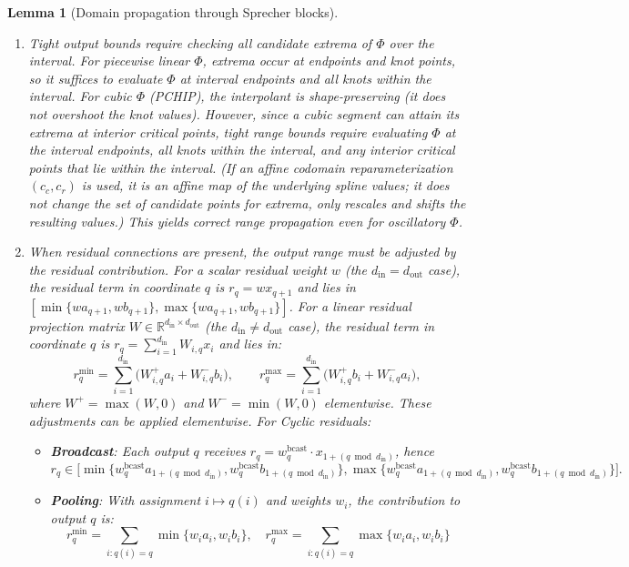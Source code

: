 \documentclass{article}
\theoremstyle{plain}
\newtheorem{lemma}{Lemma}
\theoremstyle{definition}
\theoremstyle{remark}
\begin{document}
\begin{lemma}[Domain propagation through Sprecher blocks]
\begin{enumerate}
\item Tight output bounds require checking all candidate extrema of $\Phi$ over the interval. For piecewise linear $\Phi$, extrema occur at endpoints and knot points, so it suffices to evaluate $\Phi$ at interval endpoints and all knots within the interval. For cubic $\Phi$ (PCHIP), the interpolant is shape-preserving (it does not overshoot the knot values). However, since a cubic segment can attain its extrema at interior critical points, tight range bounds require evaluating $\Phi$ at the interval endpoints, all knots within the interval, and any interior critical points that lie within the interval. (If an affine codomain reparameterization $(c_c,c_r)$ is used, it is an affine map of the underlying spline values; it does not change the set of candidate points for extrema, only rescales and shifts the resulting values.) This yields correct range propagation even for oscillatory $\Phi$.

\item When residual connections are present, the output range must be adjusted by the residual contribution. For a scalar residual weight $w$ (the $d_{\mathrm{in}}=d_{\mathrm{out}}$ case), the residual term in coordinate
$q$ is $r_q=w x_{q+1}$ and lies in $[\min\{w a_{q+1},w b_{q+1}\},\max\{w a_{q+1},w b_{q+1}\}]$. For a linear residual projection matrix $W\in\mathbb{R}^{d_{\mathrm{in}}\times d_{\mathrm{out}}}$ (the $d_{\mathrm{in}}\neq d_{\mathrm{out}}$ case), the residual term in coordinate $q$ is $r_q=\sum_{i=1}^{d_{\mathrm{in}}}W_{i,q}x_i$ and lies in:
$$r_q^{\min}=\sum_{i=1}^{d_{\mathrm{in}}}\bigl(W^{+}_{i,q}a_i+W^{-}_{i,q}b_i\bigr),\qquad
r_q^{\max}=\sum_{i=1}^{d_{\mathrm{in}}}\bigl(W^{+}_{i,q}b_i+W^{-}_{i,q}a_i\bigr),$$
where $W^{+}=\max(W,0)$ and $W^{-}=\min(W,0)$ elementwise. These adjustments can be applied elementwise. For Cyclic residuals:

   \begin{itemize}

\item 
\textbf{Broadcast}: Each output $q$ receives $r_q = w_q^{\text{bcast}} \cdot x_{1+(q \bmod d_{\mathrm{in}})}$, hence
$$r_q \in \bigl[\min\{w_q^{\text{bcast}} a_{1+(q \bmod d_{\mathrm{in}})}, w_q^{\text{bcast}} b_{1+(q \bmod d_{\mathrm{in}})}\}, \max\{w_q^{\text{bcast}} a_{1+(q \bmod d_{\mathrm{in}})}, w_q^{\text{bcast}} b_{1+(q \bmod d_{\mathrm{in}})}\}\bigr].$$
   \item 
\textbf{Pooling}: With assignment $i \mapsto q(i)$ and weights $w_i$, the contribution to output $q$ is:
   $$
r^{\min}_q = \sum_{i: q(i)=q} \min\{w_i a_i, w_i b_i\}, \quad r^{\max}_q = \sum_{i: q(i)=q} \max\{w_i a_i, w_i b_i\}$$
   \end{itemize}


\end{enumerate}
\end{lemma}
\end{document}
